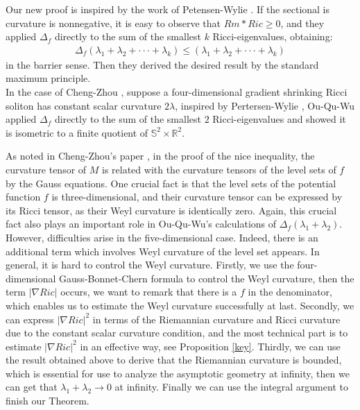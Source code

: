 \documentclass[12pt]{amsart}
\newcommand{\ban}{\begin{eqnarray*}}
\newcommand{\ean}{\end{eqnarray*}}
\begin{document}
	Our new proof is inspired by the work of Petensen-Wylie \cite{Petersen-Wylie2}. If the sectional is curvature is nonnegative, it is easy to observe that $Rm*Ric\geq 0$, and they applied $\Delta_f$ directly to the sum of the smallest $k$ Ricci-eigenvalues, obtaining:
	\ban
	\Delta_f(\lambda_1+\lambda_2+ \cdot\cdot\cdot+ \lambda_k) \leq (\lambda_1+\lambda_2+\cdot\cdot\cdot+  \lambda_k)
	\ean
	in the barrier sense. Then they derived the desired result by the standard maximum principle. \\
	
	In the case of Cheng-Zhou  \cite{Cheng-Zhou}, suppose a four-dimensional gradient shrinking Ricci soliton has constant scalar curvature $2\lambda$, inspired by Pertersen-Wylie  \cite{Petersen-Wylie}, Ou-Qu-Wu  \cite{Ou-Qu-Wu}  applied $\Delta_f$ directly to the sum of the smallest $2$ Ricci-eigenvalues and showed it is isometric to a finite quotient of $\mathbb{S}^2\times \mathbb{R}^2$.
	
	\smallskip
	As noted in Cheng-Zhou's paper \cite{Cheng-Zhou}, in the proof of the nice inequality,
	the curvature tensor of $M$ is related with the curvature tensors of the level sets of $f$ by the Gauss equations.
	One crucial fact is that the level sets of the potential function $f$ is three-dimensional, and their curvature tensor can be expressed by its Ricci tensor, as their Weyl curvature is identically zero.
	Again, this crucial fact also plays an important role in Ou-Qu-Wu's calculations of $\Delta_f(\lambda_1+\lambda_2)$.
	However, difficulties arise in the five-dimensional case. Indeed, there is an additional term which involves Weyl curvature of the level set appears. In general, it is hard to control the Weyl curvature. Firstly, we use the four-dimensional Gauss-Bonnet-Chern formula to control the Weyl curvature, then the term $|\nabla Ric|$ occurs, we want to remark that there is a $f$ in the denominator, which enables us to  estimate the Weyl curvature successfully at last. Secondly, we can express $|\nabla Ric|^2$ in  terms of the Riemannian curvature and Ricci curvature due to the constant scalar curvature condition, and the most technical part is to estimate $|\nabla Ric|^2$ in an effective way, see Proposition \ref{key}. Thirdly, we can use the result obtained above to derive that the Riemannian curvature is bounded, which is essential for use to analyze the  asymptotic geometry at infinity, then we can get that $\lambda_1+\lambda_2\rightarrow 0$ at infinity. Finally we can use the integral argument to finish our Theorem.
	
\end{document}

